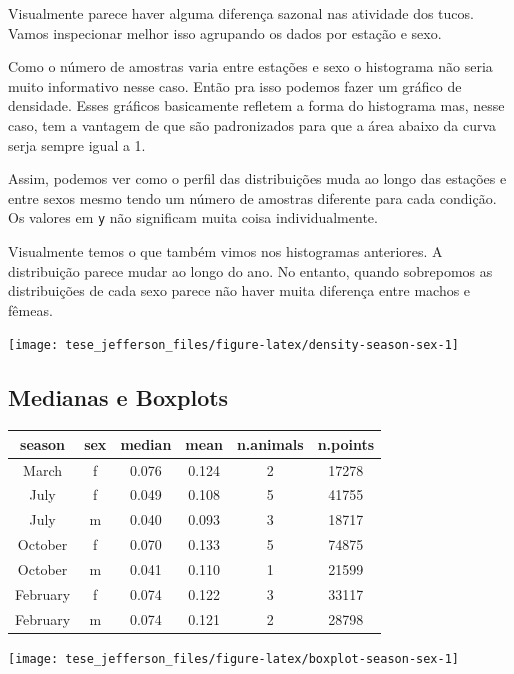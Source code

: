 \documentclass[english,msc,numbers,hidelinks]{coppe}
\begin{document}
  Visualmente parece haver alguma diferença sazonal nas atividade dos tucos. Vamos inspecionar melhor isso agrupando os dados por estação e sexo.

  Como o número de amostras varia entre estações e sexo o histograma não seria muito informativo nesse caso. Então pra isso podemos fazer um gráfico de densidade. Esses gráficos basicamente refletem a forma do histograma mas, nesse caso, tem a vantagem de que são padronizados para que a área abaixo da curva serja sempre igual a 1.

  Assim, podemos ver como o perfil das distribuições muda ao longo das estações e entre sexos mesmo tendo um número de amostras diferente para cada condição. Os valores em \texttt{y} não significam muita coisa individualmente.

  Visualmente temos o que também vimos nos histogramas anteriores. A distribuição parece mudar ao longo do ano. No entanto, quando sobrepomos as distribuições de cada sexo parece não haver muita diferença entre machos e fêmeas.
  \begin{center}\texttt{[image: tese\_jefferson\_files/figure-latex/density-season-sex-1]} \end{center}

  \newpage

  \hypertarget{medianas-e-boxplots}{%
  \subsection{Medianas e Boxplots}\label{medianas-e-boxplots}}
  \begin{table}[!h]
  \centering
  \begin{tabular}{cccccc}
  \toprule
  season & sex & median & mean & n.animals & n.points\\
  \midrule
  March & f & 0.076 & 0.124 & 2 & 17278\\
  July & f & 0.049 & 0.108 & 5 & 41755\\
  July & m & 0.040 & 0.093 & 3 & 18717\\
  October & f & 0.070 & 0.133 & 5 & 74875\\
  October & m & 0.041 & 0.110 & 1 & 21599\\
  \addlinespace
  February & f & 0.074 & 0.122 & 3 & 33117\\
  February & m & 0.074 & 0.121 & 2 & 28798\\
  \bottomrule
  \end{tabular}
  \end{table}
  \begin{center}\texttt{[image: tese\_jefferson\_files/figure-latex/boxplot-season-sex-1]} \end{center}
\end{document}
